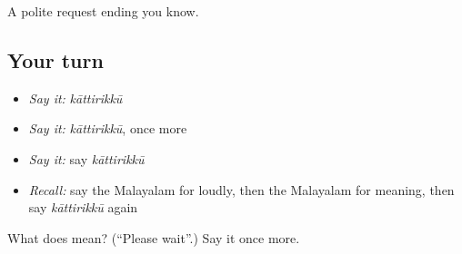 \begin{grammarlens}[title={What you've built}]
A polite request ending you know.
\end{grammarlens}

\subsection*{Your turn}
\begin{itemize}
\raggedright
  \item \emph{Say it:} \emph{kāttirikkū}
  \item \emph{Say it:} \emph{kāttirikkū}, once more
  \item \emph{Say it:} say \emph{kāttirikkū}
  \item \emph{Recall:} say the Malayalam for loudly, then the Malayalam for meaning, then say \emph{kāttirikkū} again
\end{itemize}

\begin{tcolorbox}[breakable,colback=teal!4,colframe=teal!35!black,title={Before you move on}]
What does  mean? (\textquotedblleft{}Please wait\textquotedblright{}.) Say it once more.
\end{tcolorbox}
